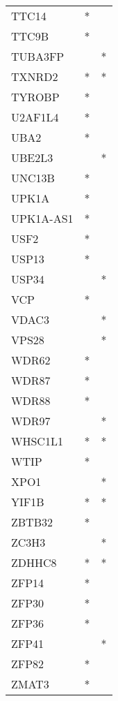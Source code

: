 \begin{longtable}{lcc}
TTC14        &         * &         \\
TTC9B        &         * &         \\
TUBA3FP      &           &       * \\
TXNRD2       &         * &       * \\
TYROBP       &         * &         \\
U2AF1L4      &         * &         \\
UBA2         &         * &         \\
UBE2L3       &           &       * \\
UNC13B       &         * &         \\
UPK1A        &         * &         \\
UPK1A-AS1    &         * &         \\
USF2         &         * &         \\
USP13        &         * &         \\
USP34        &           &       * \\
VCP          &         * &         \\
VDAC3        &           &       * \\
VPS28        &           &       * \\
WDR62        &         * &         \\
WDR87        &         * &         \\
WDR88        &         * &         \\
WDR97        &           &       * \\
WHSC1L1      &         * &       * \\
WTIP         &         * &         \\
XPO1         &           &       * \\
YIF1B        &         * &       * \\
ZBTB32       &         * &         \\
ZC3H3        &           &       * \\
ZDHHC8       &         * &       * \\
ZFP14        &         * &         \\
ZFP30        &         * &         \\
ZFP36        &         * &         \\
ZFP41        &           &       * \\
ZFP82        &         * &         \\
ZMAT3        &         * &         \\

\end{longtable}
